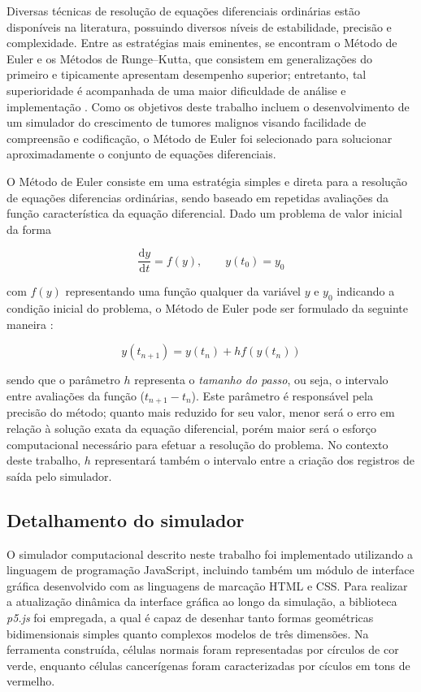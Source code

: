 \documentclass[12pt]{article}
\begin{document}
Diversas técnicas de resolução de equações diferenciais ordinárias estão disponíveis na literatura, possuindo diversos níveis de estabilidade, precisão e complexidade. Entre as estratégias mais eminentes, se encontram o Método de Euler e os Métodos de Runge--Kutta, que consistem em generalizações do primeiro e tipicamente apresentam desempenho superior; entretanto, tal superioridade é acompanhada de uma maior dificuldade de análise e implementação \cite{Butcher2016}. Como os objetivos deste trabalho incluem o desenvolvimento de um simulador do crescimento de tumores malignos visando facilidade de compreensão e codificação, o Método de Euler foi selecionado para solucionar aproximadamente o conjunto de equações diferenciais.

O Método de Euler consiste em uma estratégia simples e direta para a resolução de equações diferencias ordinárias, sendo baseado em repetidas avaliações da função característica da equação diferencial. Dado um problema de valor inicial da forma

\begin{equation}
  \frac{\mathrm{d} y}{\mathrm{d} t} = f(y), \qquad y(t_{0}) = y_{0}
\end{equation}

\noindent com $f(y)$ representando uma função qualquer da variável $y$ e $y_{0}$ indicando a condição inicial do problema, o Método de Euler pode ser formulado da seguinte maneira \cite{Butcher2016}:

\begin{equation}
  y(t_{n+1}) = y(t_{n}) + h f(y(t_{n}))
\end{equation}

\noindent sendo que o parâmetro $h$ representa o \emph{tamanho do passo}, ou seja, o intervalo entre avaliações da função ($t_{n+1} - t_{n}$). Este parâmetro é responsável pela precisão do método; quanto mais reduzido for seu valor, menor será o erro em relação à solução exata da equação diferencial, porém maior será o esforço computacional necessário para efetuar a resolução do problema. No contexto deste trabalho, $h$ representará também o intervalo entre a criação dos registros de saída pelo simulador.

\subsection{Detalhamento do simulador} \label{sec:simulator}

O simulador computacional descrito neste trabalho foi implementado utilizando a linguagem de programação JavaScript, incluindo também um módulo de interface gráfica desenvolvido com as linguagens de marcação HTML e CSS. Para realizar a atualização dinâmica da interface gráfica ao longo da simulação, a biblioteca \emph{p5.js} foi empregada, a qual é capaz de desenhar tanto formas geométricas bidimensionais simples quanto complexos modelos de três dimensões. Na ferramenta construída, células normais foram representadas por círculos de cor verde, enquanto células cancerígenas foram caracterizadas por cículos em tons de vermelho.
\end{document}
